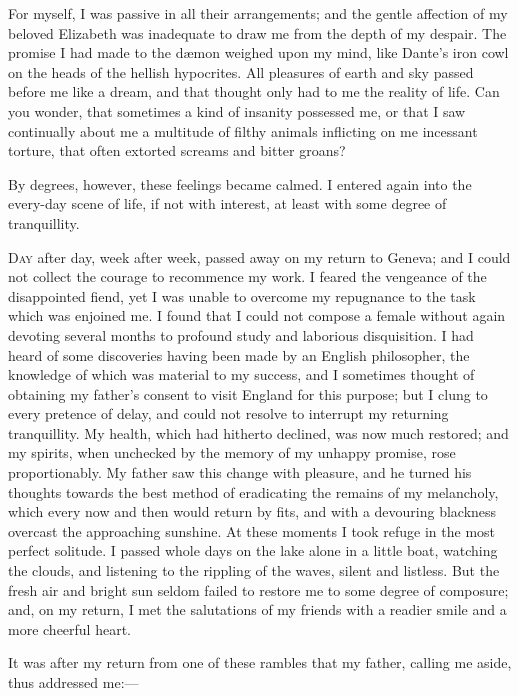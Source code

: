 For myself, I was passive in all their
arrangements; and the gentle affection
of my beloved Elizabeth was inadequate
to draw me from the depth of my
despair. The promise I had made to
the dæmon weighed upon my mind,
like Dante's iron cowl on the heads of
the hellish hypocrites. All pleasures
of earth and sky passed before me like
a dream, and that thought only had to
me the reality of life. Can you wonder,
that sometimes a kind of insanity possessed
me, or that I saw continually
about me a multitude of filthy animals
inflicting on me incessant torture,
that often extorted screams and bitter
groans?

By degrees, however, these feelings
became calmed. I entered again into
the every-day scene of life, if not with
interest, at least with some degree of
tranquillity.

\textsc{Day} after day, week after week, passed
away on my return to Geneva; and I
could not collect the courage to recommence
my work. I feared the vengeance
of the disappointed fiend, yet I was
unable to overcome my repugnance
to the task which was enjoined me. I
found that I could not compose a female
without again devoting several
months to profound study and laborious
disquisition. I had heard of
some discoveries having been made by
an English philosopher, the knowledge
of which was material to my success,
and I sometimes thought of obtaining
my father's consent to visit England
for this purpose; but I clung to every
pretence of delay, and could not resolve
to interrupt my returning tranquillity.
My health, which had hitherto declined,
was now much restored; and my spirits,
when unchecked by the memory of
my unhappy promise, rose proportionably.
My father saw this change with
pleasure, and he turned his thoughts
towards the best method of eradicating
the remains of my melancholy, which
every now and then would return by
fits, and with a devouring blackness
overcast the approaching sunshine. At
these moments I took refuge in the
most perfect solitude. I passed whole
days on the lake alone in a little boat,
watching the clouds, and listening to
the rippling of the waves, silent and
listless. But the fresh air and bright
sun seldom failed to restore me to some
degree of composure; and, on my return,
I met the salutations of my friends
with a readier smile and a more cheerful
heart.

It was after my return from one of
these rambles that my father, calling
me aside, thus addressed me:---

